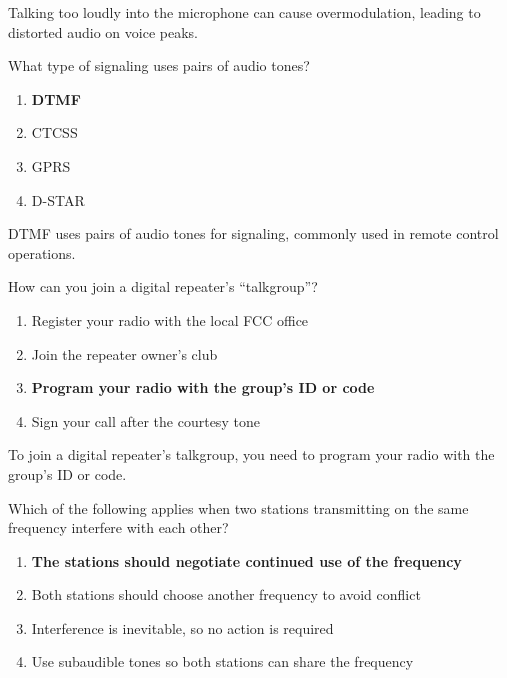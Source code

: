 Talking too loudly into the microphone can cause overmodulation, leading to distorted audio on voice peaks.

\begin{tcolorbox}[colback=gray!10!white,colframe=black!75!black,title={T2B06}]
    What type of signaling uses pairs of audio tones?
    \begin{enumerate}[label=\Alph*),noitemsep]
        \item \textbf{DTMF}
        \item CTCSS
        \item GPRS
        \item D-STAR
    \end{enumerate}
\end{tcolorbox}

DTMF uses pairs of audio tones for signaling, commonly used in remote control operations.

\begin{tcolorbox}[colback=gray!10!white,colframe=black!75!black,title={T2B07}]
    How can you join a digital repeater’s “talkgroup”?
    \begin{enumerate}[label=\Alph*),noitemsep]
        \item Register your radio with the local FCC office
        \item Join the repeater owner’s club
        \item \textbf{Program your radio with the group’s ID or code}
        \item Sign your call after the courtesy tone
    \end{enumerate}
\end{tcolorbox}

To join a digital repeater's talkgroup, you need to program your radio with the group's ID or code.

\begin{tcolorbox}[colback=gray!10!white,colframe=black!75!black,title={T2B08}]
    Which of the following applies when two stations transmitting on the same frequency interfere with each other?
    \begin{enumerate}[label=\Alph*),noitemsep]
        \item \textbf{The stations should negotiate continued use of the frequency}
        \item Both stations should choose another frequency to avoid conflict
        \item Interference is inevitable, so no action is required
        \item Use subaudible tones so both stations can share the frequency
    \end{enumerate}
\end{tcolorbox}

